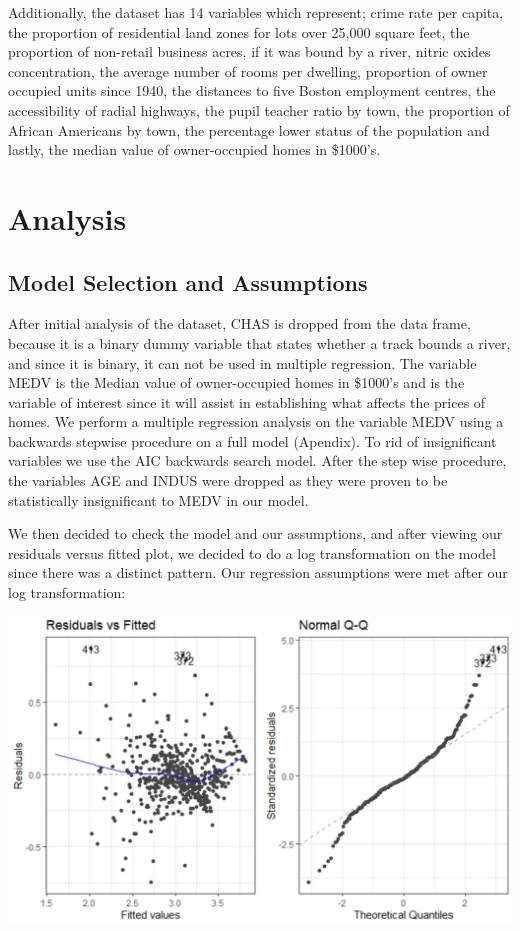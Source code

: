 \documentclass[a4paper,9pt,twocolumn,twoside,]{pinp}
\begin{document}
Additionally, the dataset has 14 variables which represent; crime rate
per capita, the proportion of residential land zones for lots over
25,000 square feet, the proportion of non-retail business acres, if it
was bound by a river, nitric oxides concentration, the average number of
rooms per dwelling, proportion of owner occupied units since 1940, the
distances to five Boston employment centres, the accessibility of radial
highways, the pupil teacher ratio by town, the proportion of African
Americans by town, the percentage lower status of the population and
lastly, the median value of owner-occupied homes in \$1000's.

\hypertarget{analysis}{%
\section{Analysis}\label{analysis}}

\hypertarget{model-selection-and-assumptions}{%
\subsection{Model Selection and
Assumptions}\label{model-selection-and-assumptions}}

After initial analysis of the dataset, CHAS is dropped from the data
frame, because it is a binary dummy variable that states whether a track
bounds a river, and since it is binary, it can not be used in multiple
regression. The variable MEDV is the Median value of owner-occupied
homes in \$1000's and is the variable of interest since it will assist
in establishing what affects the prices of homes. We perform a multiple
regression analysis on the variable MEDV using a backwards stepwise
procedure on a full model (Apendix). To rid of insignificant variables
we use the AIC backwards search model. After the step wise procedure,
the variables AGE and INDUS were dropped as they were proven to be
statistically insignificant to MEDV in our model.

We then decided to check the model and our assumptions, and after
viewing our residuals versus fitted plot, we decided to do a log
transformation on the model since there was a distinct pattern. Our
regression assumptions were met after our log transformation:

\begin{center}\includegraphics[width=0.95\linewidth]{assumptionSReport} \end{center}
\end{document}
